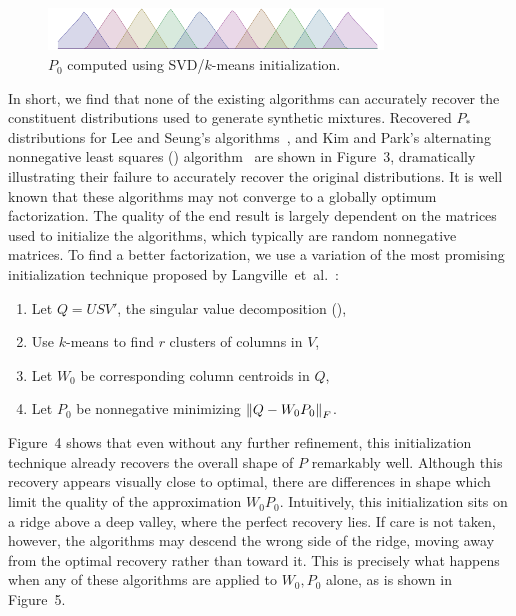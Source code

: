\documentclass[conference]{IEEEtran}
\begin{document}
\begin{figure}[t]
\begin{center}
\includegraphics[width=3.5in]{synth/Q_ki}
\end{center}
\vspace{-0.7em}
\caption{$P_0$ computed using SVD/$k$-means initialization.}
\vspace{-1em}
\end{figure}

In short, we find that none of the existing  algorithms can accurately recover the constituent distributions used to generate synthetic mixtures.
Recovered $P_*$ distributions for Lee and Seung's algorithms~\cite{Lee01}, and Kim and Park's alternating nonnegative least squares () algorithm~\cite{Kim08} are shown in Figure~3, dramatically illustrating their failure to accurately recover the original distributions.
It is well known that these algorithms may not converge to a globally optimum factorization.
The quality of the end result is largely dependent on the matrices used to initialize the algorithms, which typically are random nonnegative matrices.
To find a better factorization, we use a variation of the most promising initialization technique proposed by Langville~et~al.~\cite{Langville07}:
\begin{enumerate}
  \item Let $Q=USV'$, the singular value decomposition (),
  \item Use $k$-means to find $r$ clusters of columns in $V$,
  \item Let $W_0$ be corresponding column centroids in $Q$,
  \item Let $P_0$ be nonnegative minimizing ${\lVert Q - W_0 P_0\rVert}_F$.
\end{enumerate}
Figure~4 shows that even without any further refinement, this initialization technique already recovers the overall shape of $P$ remarkably well.
Although this recovery appears visually close to optimal, there are differences in shape which limit the quality of the approximation $W_0 P_0$.
Intuitively, this initialization sits on a ridge above a deep valley, where the perfect recovery lies.
If care is not taken, however, the  algorithms may descend the wrong side of the ridge, moving away from the optimal recovery rather than toward it.
This is precisely what happens when any of these algorithms are applied to $W_0,P_0$ alone, as is shown in Figure~5.
\end{document}

